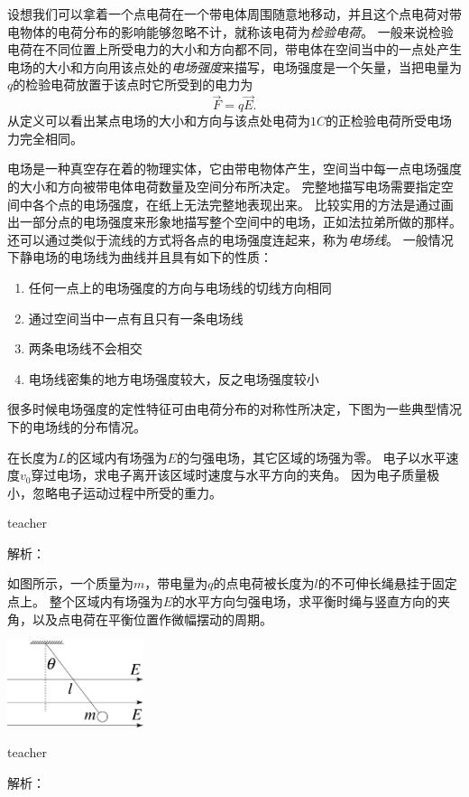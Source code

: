 设想我们可以拿着一个点电荷在一个带电体周围随意地移动，并且这个点电荷对带电物体的电荷分布的影响能够忽略不计，就称该电荷为\emph{检验电荷}。
一般来说检验电荷在不同位置上所受电力的大小和方向都不同，带电体在空间当中的一点处产生电场的大小和方向用该点处的\emph{电场强度}来描写，电场强度是一个矢量，当把电量为$q$的检验电荷放置于该点时它所受到的电力为
\begin{equation}
\vec{F}=q\vec{E}.
\end{equation}
从定义可以看出某点电场的大小和方向与该点处电荷为$1\unit{C}$的正检验电荷所受电场力完全相同。

电场是一种真空存在着的物理实体，它由带电物体产生，空间当中每一点电场强度的大小和方向被带电体电荷数量及空间分布所决定。
完整地描写电场需要指定空间中各个点的电场强度，在纸上无法完整地表现出来。
比较实用的方法是通过画出一部分点的电场强度来形象地描写整个空间中的电场，正如法拉弟所做的那样。
还可以通过类似于流线的方式将各点的电场强度连起来，称为\emph{电场线}。
一般情况下静电场的电场线为曲线并且具有如下的性质：
\begin{enumerate}
\item 任何一点上的电场强度的方向与电场线的切线方向相同
\item 通过空间当中一点有且只有一条电场线
\item 两条电场线不会相交
\item 电场线密集的地方电场强度较大，反之电场强度较小
\end{enumerate}


很多时候电场强度的定性特征可由电荷分布的对称性所决定，下图为一些典型情况下的电场线的分布情况。


\begin{example}
在长度为$L$的区域内有场强为$E$的匀强电场，其它区域的场强为零。
电子以水平速度$v_0$穿过电场，求电子离开该区域时速度与水平方向的夹角。
因为电子质量极小，忽略电子运动过程中所受的重力。
\begin{taggedblock}{teacher}

解析：
\end{taggedblock}
\end{example}



\begin{example}
如图所示，一个质量为$m$，带电量为$q$的点电荷被长度为$l$的不可伸长绳悬挂于固定点上。
整个区域内有场强为$E$的水平方向匀强电场，求平衡时绳与竖直方向的夹角，以及点电荷在平衡位置作微幅摆动的周期。
\begin{flushright}
\includegraphics[width=0.3\textwidth]{images/elec-problem-2.pdf}
\end{flushright}
\begin{taggedblock}{teacher}

解析：
\end{taggedblock}
\end{example}




